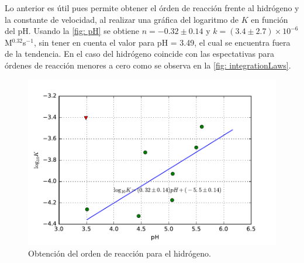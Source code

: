 \documentclass[fleqn,10pt]{SelfArx} %
\begin{document}
	Lo anterior es \'util pues permite obtener el \'orden de reacci\'on frente al hidr\'ogeno y la constante de velocidad, al realizar una gr\'afica del logaritmo de $K$ en funci\'on del pH. Usando la \autoref{fig: pH} se obtiene $n=-0.32\pm0.14$ y $k=(3.4\pm 2.7)\times10^{-6}$ M$^{0.32}$s$^{-1}$, sin tener en cuenta el valor para pH = 3.49, el cual se encuentra fuera de la tendencia. En el caso del hidr\'ogeno coincide con las espectativas para \'ordenes de reacci\'on menores a cero como se observa en la \autoref{fig: integrationLaws}.
	\begin{figure}[h]
	    \centering
	    \includegraphics[width=\linewidth]{images/pH.pdf}
	    \caption{Obtenci\'on del orden de reacci\'on para el hidr\'ogeno.}
	    \label{fig: pH}
	\end{figure}
	
\end{document}
